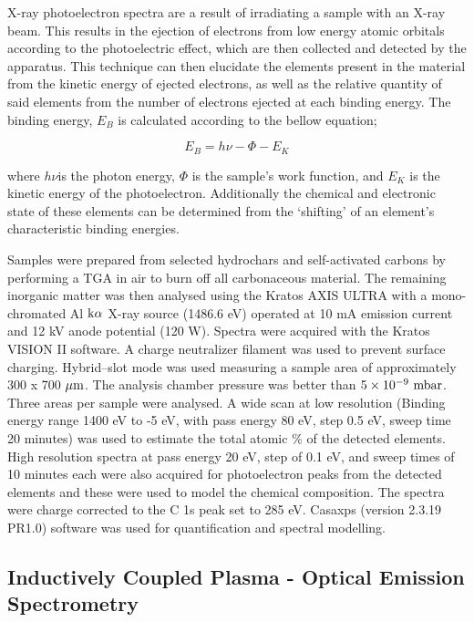 X-ray photoelectron spectra are a result of irradiating a sample with an X-ray beam. This results in the ejection of electrons from low energy atomic orbitals according to the photoelectric effect,\cite{richardson1912liii} which are then collected and detected by the apparatus. This technique can then elucidate the elements present in the material from the kinetic energy of ejected electrons, as well as the relative quantity of said elements from the number of electrons ejected at each binding energy. The binding energy, $E_B$ is calculated according to the bellow equation;

\begin{equation}
    E_B = h\nu - \Phi - E_K
\end{equation}

where $h\nu$is the photon energy, $\Phi$ is the sample’s work function, and $E_K$ is the kinetic energy of the photoelectron. Additionally the chemical and electronic state of these elements can be determined from the ‘shifting’ of an element’s characteristic binding energies.\cite{moulder1995handbook}

Samples were prepared from selected hydrochars and self-activated carbons by performing a TGA in air to burn off all carbonaceous material. The remaining inorganic matter was then analysed using the Kratos AXIS ULTRA with a mono-chromated Al $\rm k\alpha$ X-ray source (1486.6 eV) operated at 10 mA emission current and 12 kV anode potential (120 W). Spectra were acquired with the Kratos VISION II software. A charge neutralizer filament was used to prevent surface charging. Hybrid–slot mode was used measuring a
sample area of approximately 300 x 700 $\rm \mu m$. The analysis chamber pressure was better than $\rm \num{5e-9}\ mbar$. Three areas per sample were analysed. A wide scan at low resolution (Binding energy range 1400 eV to -5 eV, with pass energy 80 eV, step 0.5 eV, sweep time 20 minutes) was used to estimate the total atomic \% of the detected elements. High resolution spectra at pass energy 20 eV, step of 0.1 eV, and sweep times of 10 minutes each were also acquired for photoelectron peaks from the detected elements and these were used to model the chemical composition. The spectra were charge corrected to the C 1s peak set to 285 eV. Casaxps (version 2.3.19 PR1.0) software was used for quantification and spectral modelling.

\subsection{Inductively Coupled Plasma - Optical Emission Spectrometry}

